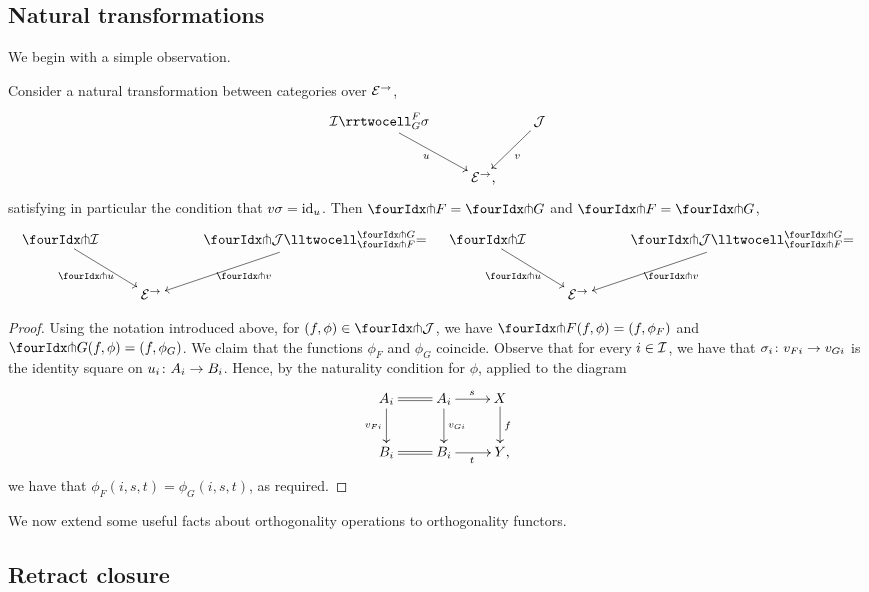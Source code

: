 \documentclass[reqno,10pt,a4paper,oneside,draft]{amsart}
\begin{document}
\subsection*{Natural transformations}

We begin with a simple observation.

\begin{proposition} \label{thm:orth-nat}
Consider a natural transformation between categories over $\catE^\to$,
\[
\xymatrix{
  \cal{I}
  \rrtwocell_G^F{\sigma}
 \ar[dr]_{u}
&&
  \cal{J}
  \ar[dl]^{v}
\\&
  \catE^\to \rlap{,}
}
\]
satisfying in particular the condition that $v \sigma = \id_u$.
Then $\liftr{F} = \liftr{G}$ and $\liftl{F} = \liftl{G}$,
\begin{align*}
\xymatrix{
  \liftr{\cal{I}}
  \ar[dr]_{\liftr{u}}
&&
  \liftr{\cal{J}}
  \lltwocell_{\liftr{F}}^{\liftr{G}}{=}
  \ar[dl]^{\liftr{v}}
\\&
  \catE^\to
}
&&
\xymatrix{
  \liftl{\cal{I}}
  \ar[dr]_{\liftl{u}}
&&
  \liftl{\cal{J}}
  \lltwocell_{\liftl{F}}^{\liftl{G}}{=}
  \ar[dl]^{\liftl{v}}
\\&
  \catE^\to
}
\end{align*}
\end{proposition}

\begin{proof} Using the notation introduced above, for $(f, \phi) \in \liftr{\cal{J}}$, we have $\liftr{F}(f, \phi) = (f, \phi_F)$ and $\liftr{G}(f, \phi) = (f, \phi_G)$.
We claim that the functions $\phi_F$ and $\phi_G$ coincide.
Observe that for every $i \in \cal{I}$, we have that $\sigma_i \co v_{Fi} \to v_{Gi}$ is the identity square on $u_i \co A_i \to B_i$.
Hence, by the naturality condition for $\phi$, applied to the diagram
\[
\xymatrix{
  A_i \ar@{=}[r] \ar[d]_{v_{Fi}} & A_i \ar[d]^{v_{Gi}} \ar[r]^{s} & X \ar[d]^{f} \\
  B_i \ar@{=}[r] & B_i \ar[r]_{t} & Y
\rlap{,}}
\]
we have that $\phi_F(i, s, t) = \phi_G(i, s, t)$, as required.
\end{proof}

We now extend some useful facts about orthogonality operations to orthogonality functors.



\subsection*{Retract closure}
\end{document}
